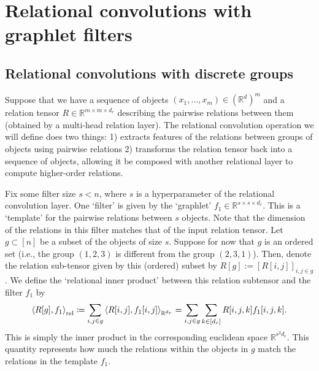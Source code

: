 \section{Relational convolutions with graphlet filters}\label{sec:relconv}

\subsection{Relational convolutions with discrete groups}
Suppose that we have a sequence of objects $(x_1, \ldots, x_m) \in (\mathbb{R}^{d})^m$ and a relation tensor $R \in \mathbb{R}^{m \times m \times d_r}$ describing the pairwise relations between them (obtained by a multi-head relation layer). The relational convolution operation we will define does two things: 1) extracts features of the relations between groups of objects using pairwise relations 2) transforms the relation tensor back into a sequence of objects, allowing it be composed with another relational layer to compute higher-order relations.

Fix some filter size $s < n$, where $s$ is a hyperparameter of the relational convolution layer. One `filter' is given by the `graphlet' $f_1 \in \mathbb{R}^{s \times s \times d_r}$. This is a `template' for the pairwise relations between $s$ objects. Note that the dimension of the relations in this filter matches that of the input relation tensor. Let $g \subset [n]$ be a subset of the objects of size $s$. Suppose for now that $g$ is an ordered set (i.e., the group $(1, 2, 3)$ is different from the group $(2, 3, 1)$). Then, denote the relation sub-tensor given by this (ordered) subset by $R[g] := [R[i,j]]_{i,j \in g}$. We define the `relational inner product' between this relation subtensor and the filter $f_1$ by
\begin{equation}
    \label{eq:relational_inner_prod_one_filt}
    \left\langle R[g], f_1 \right\rangle_\mathrm{rel} \coloneqq \sum_{i,j \in g} \left \langle R[i,j], f_1[i,j] \right\rangle_{\mathbb{R}^{d_r}} = \sum_{i,j \in g} \sum_{k \in [d_r]} R[i,j,k] f_1[i,j,k].
\end{equation}
This is simply the inner product in the corresponding euclidean space $\mathbb{R}^{s^2 d_r}$. This quantity represents how much the relations within the objects in $g$ match the relations in the template $f_1$.


